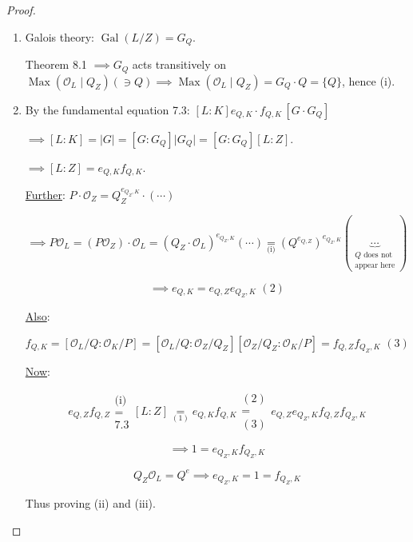 \documentclass[openany]{amsbook}
\numberwithin{section}{chapter}
\theoremstyle{definition}
\begin{document}
\begin{proof}
    \begin{enumerate}[label=\roman*)]
        \item Galois theory: \(\operatorname{Gal} (L / Z) = G_Q\). 
        
        Theorem 8.1 \(\implies G_Q\) acts transitively on \(\operatorname{Max} (\mathcal{O} _L \mid Q_Z) (\ni Q) \implies \operatorname{Max}(\mathcal{O}_L \mid Q_Z) = G_Q \cdot Q = \{ Q \}\), hence (i).
        
        \item By the fundamental equation 7.3: \([L:K] e_{Q,K}\cdot f_{Q,K} \, [G\cdot G_Q]\) 
        
        \(\implies [L:K] = \vert G \vert = [G : G_Q] \vert G_Q \vert = [G : G_Q] [L:Z]\).

        \(\implies [L:Z] = e_{Q,K}f_{Q,K}\).

        \underline{Further}: \(P\cdot \mathcal{O}_Z = Q_Z^{e_{Q_Z , K}}\cdot (\cdots)\)

        \[
            \implies P \mathcal{O}_L = (P \mathcal{O}_Z) \cdot \mathcal{O}_L = (Q_Z \cdot \mathcal{O}_L)^{e_{Q_Z , K}} (\cdots) \underset{\text{(i)}}{=} (Q^{e_{Q,Z}})^{e_{Q_Z, K}} (\underbrace{\cdots}_{\substack{\text{\(Q\) does not}\\ \text{appear here}}})
        \]

        \[
            \implies e_{Q,K} = e_{Q,Z} e_{Q_Z , K}\, \, (2)
        \]

        \underline{Also}:

        \[
            f_{Q,K} = [\mathcal{O}_L / Q : \mathcal{O}_K / P] = [\mathcal{O}_L / Q : \mathcal{O}_Z / Q_Z] [\mathcal{O}_Z / Q_Z : \mathcal{O}_K / P] = f_{Q,Z} f_{Q_Z, K} \, \, (3) 
        \]

        \underline{Now}:

        \[
            e_{Q,Z} f_{Q,Z} \substack{\text{(i)} \\ = \\ 7.3 } [L:Z] \underset{(1)}{=} e_{Q,K} f_{Q,K} \substack{(2) \\ = \\ (3)} e_{Q,Z} e_{Q_Z , K} f_{Q,Z} f_{Q_Z, K}
        \]

        \[
            \implies 1 = e_{Q_Z, K} f_{Q_Z, K}
        \]

        \[
            Q_Z \mathcal{O}_L =Q^e \implies e_{Q_Z, K} = 1 = f_{Q_Z, K}
        \]

        Thus proving (ii) and (iii).
    \end{enumerate} 
\end{proof}
\end{document}
